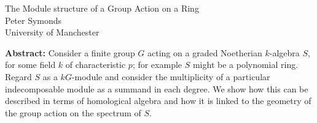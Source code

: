 \documentclass[12pt,a4paper]{article}
\begin{document}
\thispagestyle{empty} 
\begin{center}
{\large  The Module structure of a Group Action on a Ring}\\
\vspace*{.5cm}
Peter Symonds\\
University of Manchester\\
\end{center}
\vspace*{.8cm}

{\bf Abstract:} Consider a finite group $G$ acting on a graded Noetherian $k$-algebra $S$, for some field $k$ of characteristic $p$; for example $S$ might be a polynomial ring. Regard $S$ as a $kG$-module and consider the multiplicity of a particular indecomposable module as a summand in each degree. We show how this can be described in terms of homological algebra and how it is linked to the geometry of the group action on the spectrum of $S$.
\end{document}
